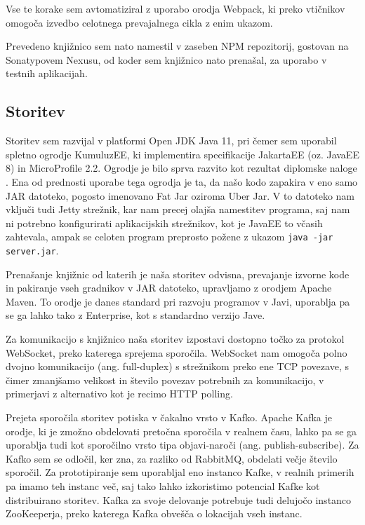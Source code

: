 \documentclass[a4paper, 12pt]{book}
\begin{document}
Vse te korake sem avtomatiziral z uporabo orodja Webpack, ki preko vtičnikov omogoča izvedbo celotnega prevajalnega cikla z enim ukazom. 

Prevedeno knjižnico sem nato namestil v zaseben NPM repozitorij, gostovan na Sonatypovem Nexusu, od koder sem knjižnico nato prenašal, za uporabo v testnih aplikacijah.

\subsection{Storitev}
\label{ch3:sec2:sub2}

Storitev sem razvijal v platformi Open JDK Java 11, pri čemer sem uporabil spletno ogrodje KumuluzEE, ki implementira specifikacije JakartaEE (oz. JavaEE 8) in MicroProfile 2.2. Ogrodje je bilo sprva razvito kot rezultat diplomske naloge \cite{kumuluz_diploma}. Ena od prednosti uporabe tega ogrodja je ta, da našo kodo zapakira v eno samo JAR datoteko, pogosto imenovano Fat Jar oziroma Uber Jar. V to datoteko nam vključi tudi Jetty strežnik, kar nam precej olajša namestitev programa, saj nam ni potrebno konfigurirati aplikacijskih strežnikov, kot je JavaEE to včasih zahtevala, ampak se celoten program preprosto požene z ukazom \verb|java -jar server.jar|.

Prenašanje knjižnic od katerih je naša storitev odvisna, prevajanje izvorne kode in pakiranje vseh gradnikov v JAR datoteko, upravljamo z orodjem Apache Maven. To orodje je danes standard pri razvoju programov v Javi, uporablja pa se ga lahko tako z Enterprise, kot s standardno verzijo Jave.

Za komunikacijo s knjižnico naša storitev izpostavi dostopno točko za protokol WebSocket, preko katerega sprejema sporočila. WebSocket nam omogoča polno dvojno komunikacijo (ang. full-duplex) s strežnikom preko ene TCP povezave, s čimer zmanjšamo velikost in število povezav potrebnih za komunikacijo, v primerjavi z alternativo kot je recimo HTTP polling.

Prejeta sporočila storitev potiska v čakalno vrsto v Kafko. Apache Kafka je orodje, ki je zmožno obdelovati pretočna sporočila v realnem času, lahko pa se ga uporablja tudi kot sporočilno vrsto tipa objavi-naroči (ang. publish-subscribe). Za Kafko sem se odločil, ker zna, za razliko od RabbitMQ, obdelati večje število sporočil. Za prototipiranje sem uporabljal eno instanco Kafke, v realnih primerih pa imamo teh instanc več, saj tako lahko izkoristimo potencial Kafke kot distribuirano storitev. Kafka za svoje delovanje potrebuje tudi delujočo instanco ZooKeeperja, preko katerega Kafka obvešča o lokacijah vseh instanc.
\end{document}
